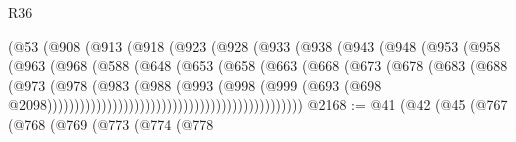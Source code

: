 \begin{lexlean}{R36}
\begin{coremodule}
                                (@53
                                  (@908
                                    (@913
                                      (@918
                                        (@923
                                          (@928
                                            (@933
                                              (@938
                                                (@943
                                                  (@948
                                                    (@953
                                                      (@958
                                                        (@963
                                                          (@968
                                                            (@588
                                                              (@648
                                                                (@653
                                                                  (@658
                                                                    (@663
                                                                      (@668
                                                                        (@673
                                                                          (@678
                                                                            (@683
                                                                              (@688
                                                                                (@973
                                                                                  (@978
                                                                                    (@983
                                                                                      (@988
                                                                                        (@993
                                                                                          (@998
                                                                                            (@999
                                                                                              (@693
                                                                                                (@698
                                                                                                  @2098)))))))))))))))))))))))))))))))))))))))))))))))
@2168 := @41
    (@42
      (@45
        (@767
          (@768
            (@769
              (@773
                (@774
                  (@778

\end{coremodule}
\end{lexlean}
